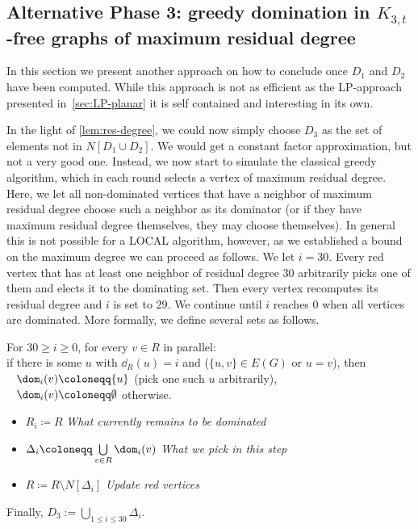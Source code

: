 
\subsection{Alternative Phase 3: greedy domination in $K_{3,t}$-free graphs of maximum
residual degree}\label{sec:greedy-planar}

In this section we present another approach on how to conclude once $D_1$ and
$D_2$ have been computed. While this approach is not as efficient as the
LP-approach presented
in~\cref{sec:LP-planar} it is self contained and interesting in its own.

In the light of \cref{lem:res-degree}, we could now simply choose
$D_3$ as the set of elements not in $N[D_1\cup D_2]$.  We would get a
constant factor approximation, but not a very good one. Instead, we
now start to simulate the classical greedy algorithm, which in each
round selects a vertex of maximum residual degree. Here, we let all
non-dominated vertices that have a neighbor of maximum residual degree
choose such a neighbor as its dominator (or if they have maximum
residual degree themselves, they may choose themselves). In general
this is not possible for a LOCAL algorithm, however, as we established
a bound on the maximum degree we can proceed as follows.  We let
$i=30$. Every red vertex that has at least one neighbor of residual
degree $30$ arbitrarily picks one of them and elects it to the
dominating set. Then every vertex recomputes its residual degree and
$i$ is set to $29$. We continue until $i$ reaches $0$ when all
vertices are dominated. More formally, we define several sets as
follows.

\begin{tcolorbox}[colback=red!5!white,colframe=red!50!black]
  For $30\geq i\geq 0$,  for every $v\in R$ in parallel:\\[2mm]
  if there is some $u$ with $\dd_R(u)=i$ and ($\{u,v\}\in E(G)$ or $u=v$), then\\
  \mbox{ } $\dom_i(v)\coloneqq \{u\}$ (pick one such $u$ arbitrarily),\\
  \mbox{ } $\dom_i(v)\coloneqq \emptyset$ otherwise.
  \begin{itemize}
    \item $R_i \coloneqq R$ \hfill \textit{\small What currently remains to be dominated}
    \item $\Delta_i \coloneqq \bigcup\limits_{v\in R} \dom_i(v)$ \hfill \textit{\small What we pick in this step}
    \item $R \coloneqq R \setminus N[\Delta_{i}]$ \hfill \textit{\small Update red vertices}
  \end{itemize}
  Finally, $D_3:=  \bigcup\limits_{1\le i\le 30} \Delta_i$.
\end{tcolorbox}

